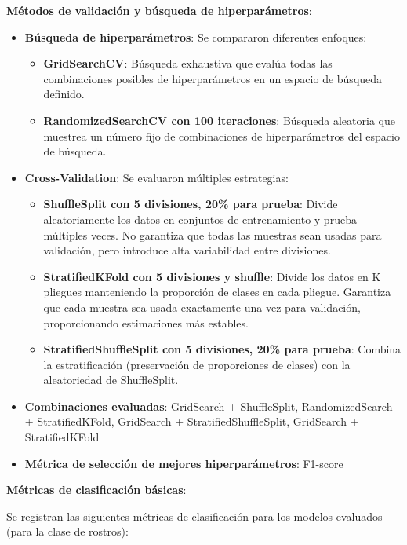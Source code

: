 \documentclass{article}
\begin{document}
\textbf{Métodos de validación y búsqueda de hiperparámetros}:
\begin{itemize}
    \item \textbf{Búsqueda de hiperparámetros}: Se compararon diferentes enfoques:
    \begin{itemize}
        \item \textbf{GridSearchCV}: Búsqueda exhaustiva que evalúa todas las combinaciones posibles de hiperparámetros en un espacio de búsqueda definido.
        \item \textbf{RandomizedSearchCV con 100 iteraciones}: Búsqueda aleatoria que muestrea un número fijo de combinaciones de hiperparámetros del espacio de búsqueda.
    \end{itemize}
    \item \textbf{Cross-Validation}: Se evaluaron múltiples estrategias:
    \begin{itemize}
        \item \textbf{ShuffleSplit con 5 divisiones, 20\% para prueba}: Divide aleatoriamente los datos en conjuntos de entrenamiento y prueba múltiples veces. No garantiza que todas las muestras sean usadas para validación, pero introduce alta variabilidad entre divisiones.
        \item \textbf{StratifiedKFold con 5 divisiones y shuffle}: Divide los datos en K pliegues manteniendo la proporción de clases en cada pliegue. Garantiza que cada muestra sea usada exactamente una vez para validación, proporcionando estimaciones más estables.
        \item \textbf{StratifiedShuffleSplit con 5 divisiones, 20\% para prueba}: Combina la estratificación (preservación de proporciones de clases) con la aleatoriedad de ShuffleSplit.
    \end{itemize}
    \item \textbf{Combinaciones evaluadas}: GridSearch + ShuffleSplit, RandomizedSearch + StratifiedKFold, GridSearch + StratifiedShuffleSplit, GridSearch + StratifiedKFold
    \item \textbf{Métrica de selección de mejores hiperparámetros}: F1-score
\end{itemize}

\textbf{Métricas de clasificación básicas}:

Se registran las siguientes métricas de clasificación para los modelos evaluados (para la clase de rostros):
\end{document}
